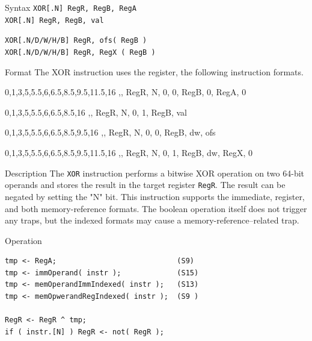 %
%
\pagebreak
{}

\begin{iPageDescEntry}{Syntax}
  \texttt{XOR[.N] RegR, RegB, RegA} \\
  \texttt{XOR[.N] RegR, RegB, val}
  
  \texttt{XOR[.N/D/W/H/B] RegR, ofs( RegB )} \\
  \texttt{XOR[.N/D/W/H/B] RegR, RegX ( RegB )}
\end{iPageDescEntry}

\begin{iPageDescEntry}{Format}
  The XOR instruction uses the register, the following instruction formats. \\
	
  \begin{flushleft}	
  \drawInstrFormat
  	{0,1,3,5,5.5,6,6.5,8.5,9.5,11.5,16}
  	{\OpCodeGrpALU,\OpCodeXOR, RegR, N, 0, 0, RegB, 0, RegA, 0}
	
  \drawInstrFormat
  	{0,1,3,5,5.5,6,6.5,8.5,16}
  	{\OpCodeGrpALU,\OpCodeXOR, RegR, N, 0, 1, RegB, val}

  \drawInstrFormat
  	{0,1,3,5,5.5,6,6.5,8.5,9.5,16}
  	{\OpCodeGrpMEM,\OpCodeXOR, RegR, N, 0, 0, RegB, dw, ofs}
 
  \drawInstrFormat
  	{0,1,3,5,5.5,6,6.5,8.5,9.5,11.5,16}
  	{\OpCodeGrpMEM,\OpCodeXOR, RegR, N, 0, 1, RegB, dw, RegX, 0}
  \end{flushleft}
\end{iPageDescEntry}

\begin{iPageDescEntry}{Description}
  The \texttt{XOR} instruction performs a bitwise XOR operation on two 64-bit operands and stores the result in the target register \texttt{RegR}. The result can be negated by setting the "N" bit. This instruction supports the immediate, register, and both memory-reference formats. The boolean operation itself does not trigger any traps, but the indexed formats may cause a memory-reference–related trap.
\end{iPageDescEntry}

\begin{iPageDescOpEntry}{Operation}
\begin{lstlisting}[style=iPageOpStyle]
tmp <- RegA;                            (S9)
tmp <- immOperand( instr );             (S15)
tmp <- memOperandImmIndexed( instr );   (S13)
tmp <- memOpwerandRegIndexed( instr );  (S9 )

RegR <- RegR ^ tmp;
if ( instr.[N] ) RegR <- not( RegR );
\end{lstlisting}
\end{iPageDescOpEntry}

